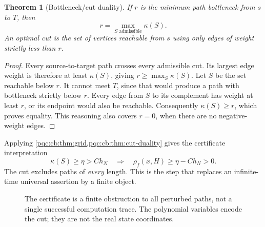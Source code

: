 \documentclass[11pt,letterpaper]{article}
\numberwithin{equation}{section}
\newtheorem{theorem}{Theorem}[section]
\theoremstyle{definition}
\theoremstyle{remark}
\begin{document}
\begin{theorem}[Bottleneck/cut duality]
\label{pqc:cb:thm:cut-duality}
If $r$ is the minimum path bottleneck from $s$ to $T$, then
\begin{equation}
 r=\max_{S\text{ admissible}}\kappa(S).
 \label{pqc:cb:eq:cut-duality}
\end{equation}
An optimal cut is the set of vertices reachable from $s$ using only edges
of weight \emph{strictly less} than $r$.
\end{theorem}
\begin{proof}
Every source-to-target path crosses every admissible cut.  Its largest edge
weight is therefore at least $\kappa(S)$, giving $r\ge\max_S\kappa(S)$.
Let $S$ be the set reachable below $r$.  It cannot meet $T$, since that would
produce a path with bottleneck strictly below $r$.  Every edge from $S$ to its
complement has weight at least $r$, or its endpoint would also be reachable.
Consequently $\kappa(S)\ge r$, which proves equality.  This reasoning also
covers $r=0$, when there are no negative-weight edges.
\end{proof}

Applying \cref{pqc:cb:thm:grid,pqc:cb:thm:cut-duality} gives the certificate interpretation
\begin{equation}
 \kappa(S)\ge\eta>Ch_N
 \quad\Longrightarrow\quad
 \rho_f(x,H)\ge\eta-Ch_N>0.
 \label{pqc:cb:eq:cut-certificate}
\end{equation}
The cut excludes paths of \emph{every} length.  This is the step that replaces
an infinite-time universal assertion by a finite object.

\begin{figure}[ht]
\centering
{}
\caption{The certificate is a finite obstruction to all perturbed paths, not a
single successful computation trace.  The polynomial variables encode the cut;
they are not the real state coordinates.}
\label{pqc:cb:fig:pipeline}
\end{figure}
\end{document}
